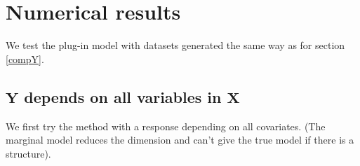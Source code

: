 \documentclass[12pt,a4paper]{report}
\begin{document}
%		
%		
%
				
		
		
\FloatBarrier
	\section{Numerical results} \label{resnumpred}
		We test the plug-in model with datasets generated the same way as for section \ref{compY}.\\
		
\subsection{$\boldsymbol{Y}$ depends on all variables in $\boldsymbol{X}$}	
We first try the method with a response depending on all covariates. (The marginal model reduces the dimension and can't give the true model if there is a structure).
\end{document}

